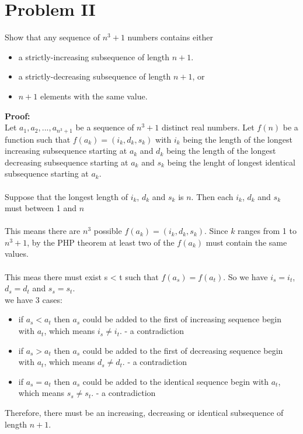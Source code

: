 \section{Problem II}
Show that any sequence of $n^3 + 1$ numbers contains either
\begin{itemize}
	\item a strictly-increasing subsequence of length $n + 1$.
	\item a strictly-decreasing subsequence of length $n + 1$, or
	\item $n + 1$ elements with the same value.
\end{itemize}
\textbf{Proof:} \\
 Let $a_1, a_2, ..., a_{n^3 + 1}$ be a sequence of $n^3 + 1$ distinct real numbers. Let $f(n)$ be a function such that $ f(a_k) = (i_k, d_k, s_k) $ with $i_k$ being the length of the longest increasing subsequence starting at $a_k$ and $d_k$ being the length of the longest decreasing subsequence starting at $a_k$ and $s_k$ being the lenght of longest identical subsequence starting at $a_k$. \\
 \\
Suppose that the longest length of $i_k$, $d_k$ and $s_k$ is $n$. Then each $i_k$, $d_k$ and $s_k$ must between 1 and $n$\\
\\
This means there are $n^3$ possible $f(a_k) = (i_k, d_k, s_k)$. Since $k$ ranges from 1 to $n^3 + 1$, by the PHP theorem at least two of the $f(a_k)$ must contain the same values.\\
\\
This meas there must exist s < t such that $f(a_s) = f(a_t)$. So we have $i_s = i_t$, $d_s = d_t$ and $s_s = s_t$.\\
we have 3 cases:\\
\begin{itemize}
	\item if $a_s < a_t$ then $a_s$ could be added to the first of increasing sequence begin with $a_t$, which means $ i_s \ne i_t $. - a contradiction
	\item if $a_s > a_t$ then $a_s$ could be added to the first of decreasing sequence begin with $a_t$, which means $ d_s \ne d_t $. - a contradiction
	\item if $a_s = a_t$ then $a_s$ could be added to the identical sequence begin with $a_t$, which means $ s_s \ne s_t $. - a contradiction
\end{itemize}

Therefore, there must be an increasing, decreasing or identical subsequence of length $n+1$.
